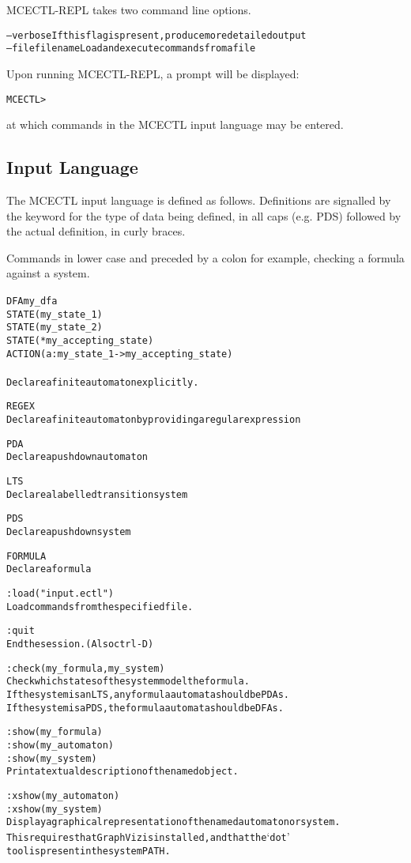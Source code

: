 \documentclass[11pt]{article}
\theoremstyle{definition}
\begin{document}
MCECTL-REPL takes two command line options.
\begin{alltt}
--verbose         If this flag is present, produce more detailed output
--file filename   Load and execute commands from a file
\end{alltt}

Upon running MCECTL-REPL, a prompt will be displayed:
\begin{alltt}
MCECTL >
\end{alltt}
at which commands in the MCECTL input language may be entered.

\subsection{Input Language}

The MCECTL input language is defined as follows.
Definitions are signalled by the keyword for the type of data being defined, in
all caps (e.g. PDS) followed by the actual definition, in curly braces.

Commands in lower case and preceded by a colon 
for example, checking a formula against a system.

\begin{alltt}
DFA my_dfa {
   STATE(  my_state_1 )
   STATE(  my_state_2 )
   STATE( *my_accepting_state )
   ACTION( a : my_state_1 -> my_accepting_state )
}
Declare a finite automaton explicitly.

REGEX
Declare a finite automaton by providing a regular expression

PDA
Declare a pushdown automaton

LTS
Declare a labelled transition system

PDS
Declare a pushdown system 

FORMULA
Declare a formula

:load("input.ectl")
Load commands from the specified file.

:quit
End the session. (Also ctrl-D)

:check(my_formula, my_system)
Check which states of the system model the formula.
If the system is an LTS, any formula automata should be PDAs.
If the system is a PDS, the formula automata should be DFAs.

:show(my_formula)
:show(my_automaton)
:show(my_system)
Print a textual description of the named object.

:xshow(my_automaton)
:xshow(my_system)
Display a graphical representation of the named automaton or system.
This requires that GraphViz is installed, and that the `dot'
tool is present in the system PATH.
\end{alltt}
\end{document}
